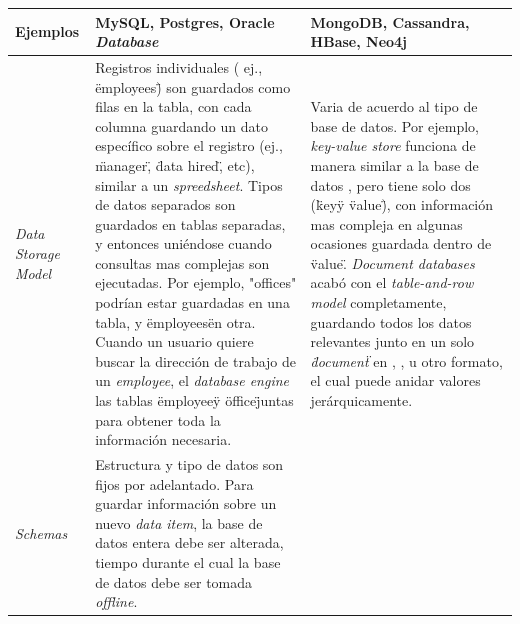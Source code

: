 \begin{table}[h!]
\begin{tabular}{ |L{0.1\paperwidth}|L{0.3\paperwidth}|L{0.3\paperwidth}|}
\\ \hline
	Ejemplos&%
	MySQL, Postgres, Oracle \textit{Database}&
	MongoDB, Cassandra, HBase, Neo4j
\\ \hline
	\textit{Data Storage Model}&
	Registros individuales ( ej., \"employees\") son guardados como filas en la tabla, con cada columna guardando un dato específico sobre el registro (ej., \"manager\", \"data hired\", etc), similar a un \textit{spreedsheet}. Tipos de datos separados son guardados en tablas separadas, y entonces uniéndose cuando consultas mas complejas son ejecutadas. Por ejemplo, "offices" podrían estar guardadas en una tabla, y \"employees\" en otra. Cuando un usuario quiere buscar la dirección de trabajo de un \textit{employee}, el \textit{database engine} \joins las tablas \"employee\" y \"office\" juntas para obtener toda la información necesaria.&
	
	Varia de acuerdo al tipo de base de datos. Por ejemplo, \textit{key-value store} funciona de manera similar a la base de datos \sql, pero tiene solo dos \columns (\"key\" y \"value\"), con información mas compleja en algunas ocasiones guardada dentro de \columns \"value\". \textit{Document databases} acabó con el \textit{table-and-row model} completamente, guardando todos los datos relevantes junto en un solo \textit{\"document\"} en \json, \xml, u otro formato, el cual puede anidar valores jerárquicamente.
	

\\ \hline
	\textit{Schemas}&
	
	Estructura y tipo de datos son fijos por adelantado. Para guardar información sobre un nuevo \textit{data item}, la base de datos entera debe ser alterada, tiempo durante el cual la base de datos debe ser tomada \textit{offline}.&


\end{tabular}
\end{table}
